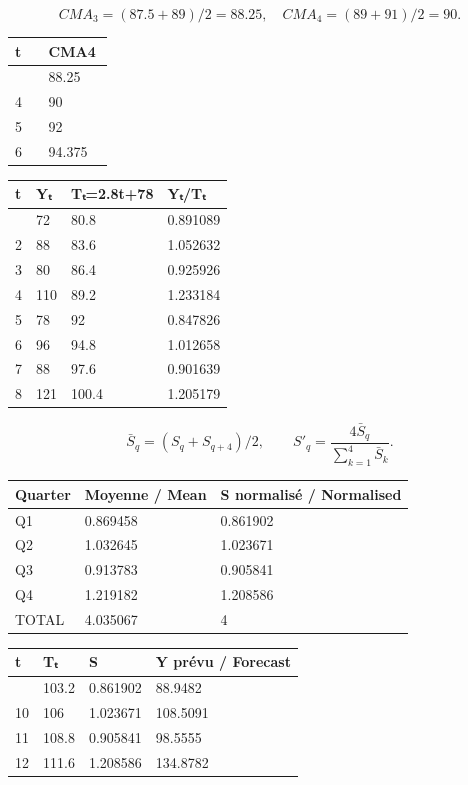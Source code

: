 \documentclass[11pt,a4paper]{article}
\begin{document}
\[CMA_3=(87.5+89)/2=88.25,\quad CMA_4=(89+91)/2=90.\]

\begin{longtable}[]{@{}p{0.32\linewidth}p{0.62\linewidth}@{}}
\toprule\noalign{}
t & CMA4 \\
\midrule\noalign{}
\endhead
\bottomrule\noalign{}
\endlastfoot
3 & 88.25 \\
4 & 90 \\
5 & 92 \\
6 & 94.375 \\
\end{longtable}

\begin{longtable}[]{@{}llll@{}}
\toprule\noalign{}
t & Yₜ & Tₜ=2.8t+78 & Yₜ/Tₜ \\
\midrule\noalign{}
\endhead
\bottomrule\noalign{}
\endlastfoot
1 & 72 & 80.8 & 0.891089 \\
2 & 88 & 83.6 & 1.052632 \\
3 & 80 & 86.4 & 0.925926 \\
4 & 110 & 89.2 & 1.233184 \\
5 & 78 & 92 & 0.847826 \\
6 & 96 & 94.8 & 1.012658 \\
7 & 88 & 97.6 & 0.901639 \\
8 & 121 & 100.4 & 1.205179 \\
\end{longtable}

\[\bar S_q=(S_q+S_{q+4})/2,\qquad S'_q=\frac{4\bar S_q}{\sum_{k=1}^4\bar S_k}.\]

\begin{longtable}[]{@{}lll@{}}
\toprule\noalign{}
Quarter & Moyenne / Mean & S\textquotesingle{} normalisé / Normalised \\
\midrule\noalign{}
\endhead
\bottomrule\noalign{}
\endlastfoot
Q1 & 0.869458 & 0.861902 \\
Q2 & 1.032645 & 1.023671 \\
Q3 & 0.913783 & 0.905841 \\
Q4 & 1.219182 & 1.208586 \\
TOTAL & 4.035067 & 4 \\
\end{longtable}

\begin{longtable}[]{@{}llll@{}}
\toprule\noalign{}
t & Tₜ & S\textquotesingle{} & Y prévu / Forecast \\
\midrule\noalign{}
\endhead
\bottomrule\noalign{}
\endlastfoot
9 & 103.2 & 0.861902 & 88.9482 \\
10 & 106 & 1.023671 & 108.5091 \\
11 & 108.8 & 0.905841 & 98.5555 \\
12 & 111.6 & 1.208586 & 134.8782 \\
\end{longtable}
\end{document}
